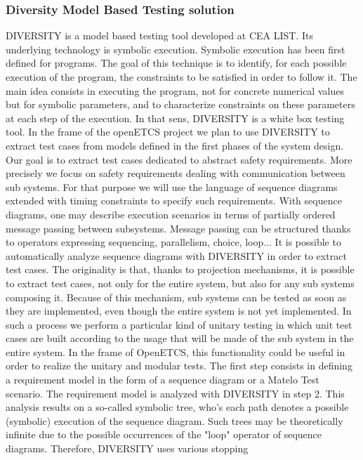\documentclass{template/openetcs_report}
\begin{document}
\subsubsection{Diversity Model Based Testing solution}
DIVERSITY is a model based testing tool developed at CEA LIST. Its underlying technology is symbolic
 execution. Symbolic execution has been first defined for programs. The goal of this technique is
 to identify, for each possible execution of the program, the constraints to be satisfied in order to 
follow it. The main idea consists in executing the program, not for concrete numerical values but for 
symbolic parameters, and to characterize constraints on these parameters at each step of the execution.
 In that sens, DIVERSITY is a white box testing tool.
In the frame of the openETCS project we plan to use DIVERSITY to extract test cases from models 
defined in the first phases of the system design. Our goal is to extract test cases dedicated to
 abstract safety requirements. More precisely we focus on safety requirements dealing with 
communication between sub systems. For that purpose we will use the language of sequence 
diagrams extended with timing constraints to specify such requirements. With sequence diagrams,
 one may describe execution scenarios in terms of partially ordered message passing between 
subsystems. Message passing can be structured thanks to operators expressing sequencing, 
parallelism, choice, loop...  
It is possible to automatically analyze sequence diagrams with DIVERSITY in order to extract test
 cases. The originality is that, thanks to projection mechanisms, it is possible to extract test cases,
 not only for the entire system, but also for any sub systems composing it. Because of this mechanism, 
sub systems can be tested as soon as they are implemented, even though the entire system is 
not yet implemented. In such a process we perform a particular kind of unitary testing in which 
unit test cases are built according to the usage that will be made of the sub system in the entire
 system. In the frame of OpenETCS, this functionality could be useful in order to realize the unitary
 and modular tests.
The first step consists in defining a requirement model in the form of a sequence diagram or a
 Matelo Test scenario. The requirement model is analyzed with DIVERSITY in step 2. This analysis 
results on a so-called symbolic tree, who’s each path denotes a possible (symbolic) execution of
 the sequence diagram. Such trees may be theoretically infinite due to the possible occurrences
 of the "loop" operator of sequence diagrams. Therefore, DIVERSITY uses various stopping 
\end{document}
